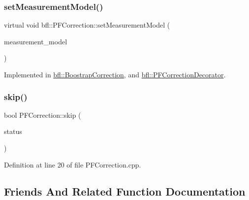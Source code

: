 \subsubsection{\texorpdfstring{set\+Measurement\+Model()}{setMeasurementModel()}}
{\footnotesize\ttfamily virtual void bfl\+::\+P\+F\+Correction\+::set\+Measurement\+Model (\begin{DoxyParamCaption}\item[{std\+::unique\+\_\+ptr$<$ \mbox{\hyperlink{classbfl_1_1MeasurementModel}{Measurement\+Model}} $>$}]{measurement\+\_\+model }\end{DoxyParamCaption})\hspace{0.3cm}{\ttfamily [pure virtual]}}



Implemented in \mbox{\hyperlink{classbfl_1_1BoostrapCorrection_af6e02e5d6e6426cbee2825a77c79da43}{bfl\+::\+Boostrap\+Correction}}, and \mbox{\hyperlink{classbfl_1_1PFCorrectionDecorator_a6e96dbb6591e44d9ebaa186c6e50569b}{bfl\+::\+P\+F\+Correction\+Decorator}}.

\mbox{\label{classbfl_1_1PFCorrection_ab25e625ea12fe257e0eb85d465835e62}} 
\subsubsection{\texorpdfstring{skip()}{skip()}}
{\footnotesize\ttfamily bool P\+F\+Correction\+::skip (\begin{DoxyParamCaption}\item[{const bool}]{status }\end{DoxyParamCaption})}



Definition at line 20 of file P\+F\+Correction.\+cpp.



\subsection{Friends And Related Function Documentation}
\mbox{\label{classbfl_1_1PFCorrection_a58497dd469f7041f127774bccdc78022}} 
